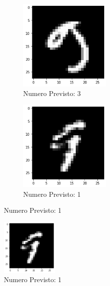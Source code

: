 \documentclass[12pt, a4paper]{article}
\begin{document}
\begin{figure}[H]
    \begin{subfigure}{0.5\textwidth}
        \centering
        \caption{Numero Previsto: 3}
        \includegraphics[width=0.50\textwidth]{nove3.png}
    \end{subfigure}
    \begin{subfigure}{0.5\textwidth}
        \centering
        \caption{Numero Previsto: 1}
        \includegraphics[width=0.50\textwidth]{nove4.png}
    \end{subfigure}
\end{figure}
\begin{figure}[H]
    \centering
    \caption{Numero Previsto: 1}
    \includegraphics[width=0.25\textwidth]{nove5.png}
\end{figure}
\end{document}
